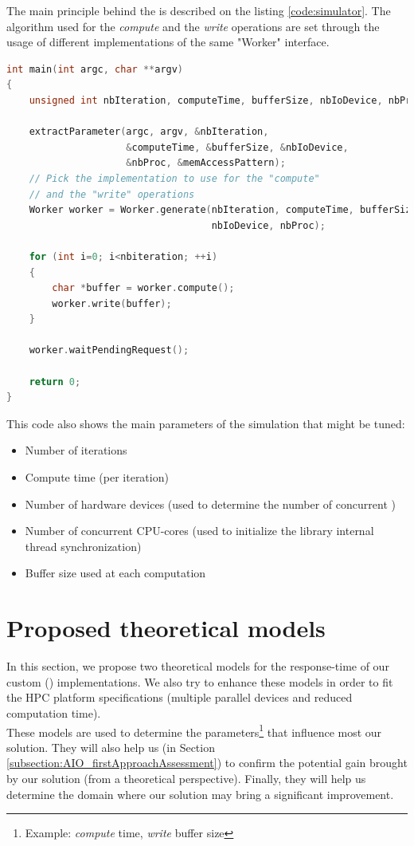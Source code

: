 		The main principle behind the \toolSimulationSoftware\space is described on the listing \ref{code:simulator}.   The algorithm used for the \emph{compute} and the \emph{write} operations are set through the usage of different implementations of the same "Worker" interface.\\
		\begin{minipage}{\linewidth}
			\begin{lstlisting}[language=C++, caption={\toolTargetSoftware\space \toolSimulationSoftware}, label={code:simulator}]
int main(int argc, char **argv)
{
    unsigned int nbIteration, computeTime, bufferSize, nbIoDevice, nbProc;

    extractParameter(argc, argv, &nbIteration,
                     &computeTime, &bufferSize, &nbIoDevice,
                     &nbProc, &memAccessPattern);
    // Pick the implementation to use for the "compute"
    // and the "write" operations
    Worker worker = Worker.generate(nbIteration, computeTime, bufferSize,
                                    nbIoDevice, nbProc);

    for (int i=0; i<nbiteration; ++i)
    {
        char *buffer = worker.compute();
        worker.write(buffer);
    }

    worker.waitPendingRequest();

    return 0;
}
			\end{lstlisting}
			\end{minipage}
		This code also shows the main parameters of the simulation that might be tuned:
		\begin{itemize}
			\item Number of iterations
			\item Compute time (per iteration)
			\item Number of hardware \notationIO\space devices (used to determine the number of concurrent \notationaioWriteThreads)
			\item Number of concurrent CPU-cores (used to initialize the \notationaioShort\space library internal thread synchronization)
			\item Buffer size used at each computation
		\end{itemize}


\section{Proposed theoretical models}\label{section:model}
	In this section, we propose two theoretical models for the response-time of our custom (\notationaio) implementations.   We also try to enhance these models in order to fit the HPC platform specifications (multiple parallel \notationIO\space devices and reduced computation time).\\
	These models are used to determine the parameters\footnote{Example: \emph{compute} time, \emph{write} buffer size} that influence most our solution.     They will also help us (in Section \ref{subsection:AIO_firstApproachAssessment}) to confirm the potential gain brought by our solution (from a theoretical perspective).   Finally, they will help us determine the domain where our solution may bring a significant improvement.\\

